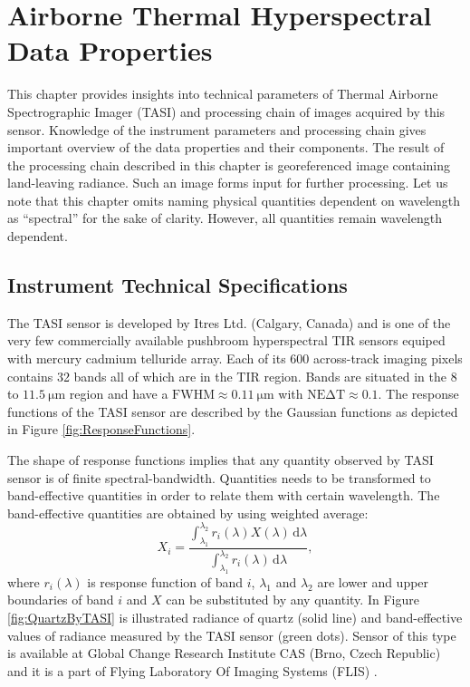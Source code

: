 \chapter{Airborne Thermal Hyperspectral Data Properties}
\label{chap:Data}

This chapter provides insights into technical parameters of Thermal Airborne Spectrographic Imager (TASI) and processing chain of images acquired by this sensor. Knowledge of the instrument parameters and processing chain gives important overview of the data properties and their components. The result of the processing chain described in this chapter is georeferenced image containing land-leaving radiance. Such an image forms input for further processing. 
Let us note that this chapter omits naming physical quantities dependent on wavelength as ``spectral'' for the sake of clarity. However, all quantities remain wavelength dependent.

\section{Instrument Technical Specifications}

The TASI sensor is developed by Itres Ltd. (Calgary, Canada) and is one of the very few commercially available pushbroom hyperspectral TIR sensors equiped with mercury cadmium telluride array. Each of its 600 across-track imaging pixels contains 32 bands all of which are in the TIR region. Bands are situated in the 8 to $\SI{11.5}{\micro\meter}$ region and have a $\mathrm{FWHM} \approx \SI{0.11}{\micro\meter}$ with $\mathrm{NE\Delta T} \approx 0.1$. The response functions of the TASI sensor are described by the Gaussian functions as depicted in Figure \ref{fig:ResponseFunctions}. 

The shape of response functions implies that any quantity observed by TASI sensor is of finite spectral-bandwidth. Quantities needs to be transformed to band-effective quantities in order to relate them with certain wavelength. The band-effective quantities are obtained by using weighted average:
\begin{equation}
	X_i = \frac{\int_{\lambda_1}^{\lambda_2} r_i(\lambda) X(\lambda) \,\mathrm{d}\lambda}{\int_{\lambda_1}^{\lambda_2} r_i(\lambda)\,\mathrm{d}\lambda},
	\label{eq:weightedAverage}
\end{equation}
where $r_i(\lambda)$ is response function of band $i$, $\lambda_1$ and $\lambda_2$ are lower and upper boundaries of band $i$ and $X$ can be substituted by any quantity. In Figure \ref{fig:QuartzByTASI} is illustrated radiance of quartz (solid line) and band-effective values of radiance measured by the TASI sensor (green dots). Sensor of this type is available at Global Change Research Institute CAS (Brno, Czech Republic) and it is a part of Flying Laboratory Of Imaging Systems (FLIS) \cite{HF14}.

